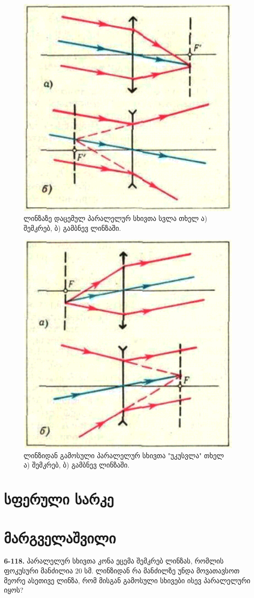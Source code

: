 \documentclass[a4paper]{book}
\begin{document}
		\begin{figure}[h]
		   \centering
           \includegraphics[width=0.5\columnwidth]{figures/optics_2}
           \caption{ლინზაზე დაცემულ პარალელურ სხივთა სვლა თხელ ა) შემკრებ, ბ) გამბნევ ლინზაში.}
           \label{fig:optics_2}
        \end{figure}

		\begin{figure}[h]
		   \centering
           \includegraphics[width=0.5\columnwidth]{figures/optics_3}
           \caption{ლინზიდან გამოსული პარალელურ სხივთა "უკუსვლა" თხელ ა) შემკრებ, ბ) გამბნევ ლინზაში.}
           \label{fig:optics_3}
        \end{figure}

\section{სფერული სარკე}

\section{მარგველაშვილი}
\textbf{6-118.} პარალელურ სხივთა კონა ეცემა შემკრებ ლინზას, რომლის ფოკუსური მანძილია 20 სმ. ლინზიდან რა მანძილზე უნდა მოვათავსოთ მეორე ასეთივე ლინზა, რომ მისგან გამოსული სხივები ისევ პარალელური იყოს?
\end{document}

